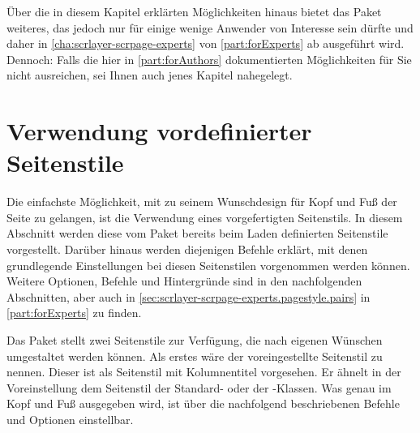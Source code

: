 Über die in diesem Kapitel erklärten Möglichkeiten hinaus bietet das Paket
 weiteres, das jedoch nur für einige wenige
Anwender von Interesse sein dürfte und daher in
\autoref{cha:scrlayer-scrpage-experts} von \autoref{part:forExperts} ab
 ausgeführt wird. Dennoch: Falls die
hier in \autoref{part:forAuthors} dokumentierten Möglichkeiten für Sie nicht
ausreichen, sei Ihnen auch jenes Kapitel nahegelegt.




\section{Verwendung vordefinierter Seitenstile}

Die einfachste Möglichkeit, mit  zu seinem
Wunschdesign für Kopf und Fuß der Seite zu gelangen, ist die Verwendung eines
vorgefertigten Seitenstils.
%
\iftrue %
  In diesem Abschnitt werden diese vom Paket  bereits
  beim Laden definierten Seitenstile vorgestellt. Darüber hinaus werden
  diejenigen Befehle erklärt, mit denen grundlegende Einstellungen bei diesen
  Seitenstilen vorgenommen werden können. Weitere Optionen, Befehle und
  Hintergründe sind in den nachfolgenden Abschnitten, aber auch in
  \autoref{sec:scrlayer-scrpage-experts.pagestyle.pairs} in
  \autoref{part:forExperts} zu finden.%
\fi

\begin{Declaration}
\end{Declaration}
Das Paket  stellt zwei Seitenstile zur Verfügung,
die nach eigenen Wünschen umgestaltet werden
können. Als erstes wäre der voreingestellte
Seitenstil  zu
nennen. Dieser ist als Seitenstil mit Kolumnentitel vorgesehen. Er ähnelt in
der Voreinstellung dem Seitenstil
 der Standard-
oder der \KOMAScript-Klassen. Was genau im Kopf und Fuß ausgegeben wird, ist
über die nachfolgend beschriebenen Befehle und Optionen einstellbar.

